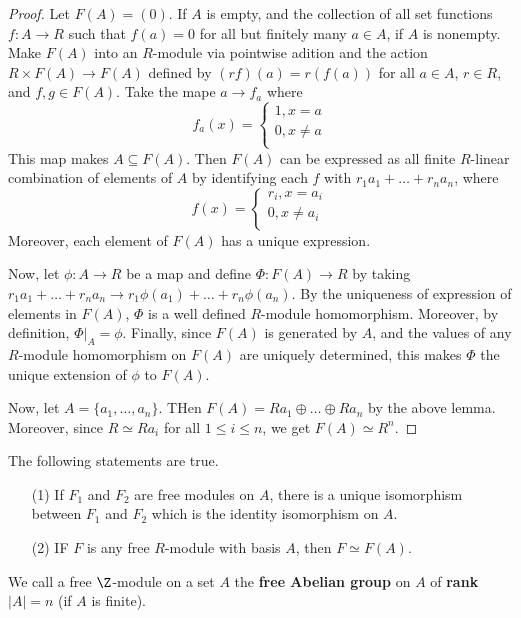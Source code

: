\begin{proof}
    Let $F(A)=(0)$. If $A$ is empty, and the collection of all set functions
    $f:A \xrightarrow{} R$ such that $f(a)=0$ for all but finitely many $a \in
    A$, if  $A$ is nonempty. Make $F(A)$ into an $R$-module via pointwise
    adition and the action  $R \times F(A) \xrightarrow{} F(A)$ defined by
    $(rf)(a)=r(f(a))$ for all $a \in A$,  $r \in R$, and  $f,g \in F(A)$. Take
    the mape $a \xrightarrow{} f_a$ where
    \begin{equation*}
        f_a(x)=\begin{cases}
            1, x=a  \\
            0, x \neq a \\
        \end{cases}
    \end{equation*}
    This map makes $A \subseteq F(A)$. Then $F(A)$ can be expressed as all
    finite $R$-linear combination of elements of  $A$ by identifying each  $f$
    with  $r_1a_1+\dots+r_na_n$, where
    \begin{equation*}
        f(x)=\begin{cases}
            r_i, x=a_i  \\
            0, x \neq a_i \\
        \end{cases}
    \end{equation*}
    Moreover, each element of $F(A)$ has a unique expression.

    Now, let $\phi:A \xrightarrow{} R$ be a map and define $\Phi:F(A)
    \xrightarrow{} R$ by taking $r_1a_1+\dots+r_na_n \xrightarrow{}
    r_1\phi(a_1)+\dots+r_n\phi(a_n)$. By the uniqueness of expression of
    elements in $F(A)$, $\Phi$ is a well defined $R$-module homomorphism.
    Moreover, by definition, $\Phi|_A=\phi$. Finally, since  $F(A)$ is generated
    by $A$, and the values of any $R$-module homomorphism on $F(A)$ are uniquely
    determined, this makes $\Phi$ the unique extension of  $\phi$ to  $F(A)$.

    Now, let $A=\{a_1, \dots, a_n\}$. THen $F(A)=Ra_1 \oplus \dots \oplus Ra_n$
    by the above lemma. Moreover, since $R \simeq Ra_i$ for all $1 \leq i \leq
    n$, we get $F(A) \simeq R^n$.
\end{proof}
\begin{corollary}
    The following statements are true.
    \begin{enumerate}
        \item[(1)] If $F_1$ and $F_2$ are free modules on $A$, there is a unique
            isomorphism between  $F_1$ and $F_2$ which is the identity
            isomorphism on $A$.

        \item[(2)] IF $F$ is any free $R$-module with basis  $A$, then  $F
            \simeq F(A)$.
    \end{enumerate}
\end{corollary}

\begin{definition}
    We call a free $\Z$-module on a set  $A$ the  \textbf{free Abelian group} on
    $A$ of  \textbf{rank} $|A|=n$ (if $A$ is finite).
\end{definition}
